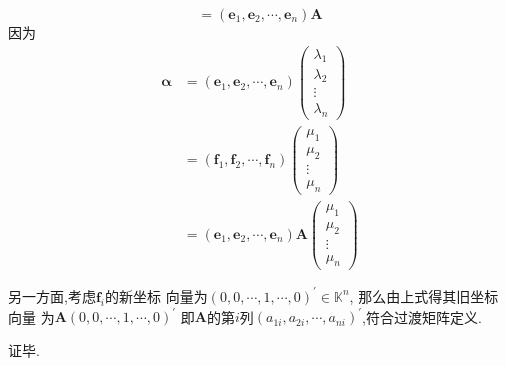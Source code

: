 \begin{green}
\begin{Proof}
\[    =\left(\bm{e}_1,\bm{e}_2,\cdots,\bm{e}_n\right)\bm{A}
\]
因为
\begin{align*}
    \bm{\alpha}&=\left(\bm{e}_1,\bm{e}_2,\cdots,\bm{e}_n\right)\begin{pmatrix}
        \lambda_1\\\lambda_2\\\vdots\\\lambda_n
    \end{pmatrix}\\
    &=\left(\bm{f}_1,\bm{f}_2,\cdots,\bm{f}_n\right)
    \begin{pmatrix}
        \mu_1\\\mu_2\\\vdots\\\mu_n
    \end{pmatrix}\\
    &=\left(\bm{e}_1,\bm{e}_2,\cdots,\bm{e}_n\right)\bm{A}
    \begin{pmatrix}
        \mu_1\\\mu_2\\\vdots\\\mu_n
    \end{pmatrix}
\end{align*}

另一方面,考虑$\bm{f}_i$的新坐标
向量为$\left(0,0,\cdots,1,\cdots,0\right)^{\prime}\in \mathbb{K}^n$,
那么由上式得其旧坐标向量
为$
\bm{A}\left(
    0,0,\cdots,1,\cdots,0
\right)^{\prime}
$
即$\bm{A}$的第$i$列$\left(
    a_{1i},a_{2i},\cdots,a_{ni}
\right)^{\prime}$,符合过渡矩阵定义.

证毕.
\end{Proof}
\end{green}
